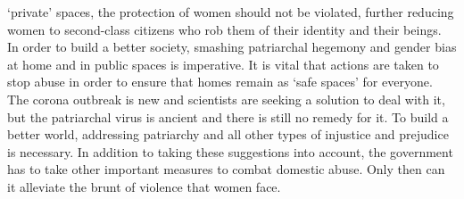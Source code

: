 \begin{multicols}{2}
‘private' spaces, the protection of women should not be violated, further reducing women to
second-class citizens who rob them of their identity and their beings. In order to build a better
society, smashing patriarchal hegemony and gender bias at home and in public spaces is
imperative. It is vital that actions are taken to stop abuse in order to ensure that homes remain
as ‘safe spaces' for everyone. The corona outbreak is new and scientists are seeking a solution
to deal with it, but the patriarchal virus is ancient and there is still no remedy for it. To build a
better world, addressing patriarchy and all other types of injustice and prejudice is necessary.
In addition to taking these suggestions into account, the government has to take other
important measures to combat domestic abuse. Only then can it alleviate the brunt of violence
that women face. 
\end{multicols}
\label{end2021-art7}
